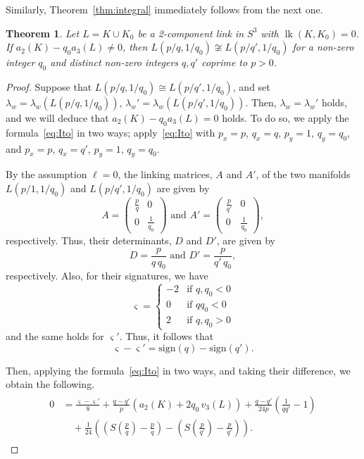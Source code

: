 \documentclass{amsart}
\newtheorem{theorem}{Theorem}
\theoremstyle{remark}
\newcommand{\lk}{\mathop{\mathrm{lk}}\nolimits}
\begin{document}
Similarly, Theorem~\ref{thm:integral} immediately follows from the next one.  

\begin{theorem}
    Let $L = K \cup K_0$ be a 2-component link in $S^3$ with $\lk(K,K_0)=0$. 
    If $a_2 (K) - q_0 a_3(L) \ne 0$, then $L(p/q,1/q_0) \not\cong L(p/q', 1/q_0)$ for a non-zero integer $q_0$ and distinct non-zero integers $q, q'$ coprime to $p>0$. 
\end{theorem}

\begin{proof}
Suppose that $L(p/q,1/q_0) \cong L(p/q', 1/q_0)$, and set $\lambda_w = \lambda_w ( L(p/q,1/q_0))$, $\lambda_w' = \lambda_w ( L(p/q', 1/q_0))$. 
Then, $\lambda_w = \lambda_w'$ holds, and we will deduce that $a_2 (K) - q_0 a_3(L) = 0$ holds. 
To do so, we apply the formula~\eqref{eq:Ito} in two ways; 
apply~\eqref{eq:Ito} with $p_x=p$, $q_x=q$, $p_y=1$, $q_y=q_0$, and $p_x=p$, $q_x=q'$, $p_y=1$, $q_y=q_0$. 

By the assumption $\ell=0$, the linking matrices, $A$ and $A'$, of the two manifolds $L(p/1,1/q_0)$ and $L(p/q', 1/q_0)$ are given by
\[ A = \begin{pmatrix} \frac{p}{q} & 0 \\ 0 & \frac{1}{q_0} \end{pmatrix} \text{ and } A'=\begin{pmatrix} \frac{p}{q'} & 0 \\ 0 & \frac{1}{q_0} \end{pmatrix}, \] 
respectively. 
Thus, their determinants, $D$ and $D'$, are given by 
\[ D = \frac{p}{q\,q_0} \text{ and } D'=\frac{p}{q'\,q_0} , \]
respectively. 
Also, for their signatures, we have
\[
\varsigma = 
\begin{cases}
    -2 & \text{if } q,q_0 <0 \\
    0 & \text{if } q q_0 <0 \\
    2 & \text{if } q,q_0 >0
\end{cases}
\]
and the same holds for $\varsigma'$. 
Thus, it follows that 
\[ \varsigma - \varsigma' = \mathrm{sign}(q) - \mathrm{sign}(q').\]

Then, applying the formula~\eqref{eq:Ito} in two ways, and taking their difference, we obtain the following. 
\begin{align}\label{Eq2}
\begin{split}
0
&= \frac{\varsigma - \varsigma'}{8} 
+ \frac{q-q'}{p} \left( a_2(K) + 2 q_0 \,v_3(L) \right)
+ \frac{q-q'}{24p} \left( \frac{1}{qq'} - 1 \right)\\
&\quad + \frac{1}{24} \left( \left( S\left( \frac{p}{q} \right) - \frac{p}{q} \right) - \left( S\left( \frac{p}{q'} \right) - \frac{p}{q'} \right) \right) . 
\end{split}
\end{align}


\end{proof}
\end{document}
